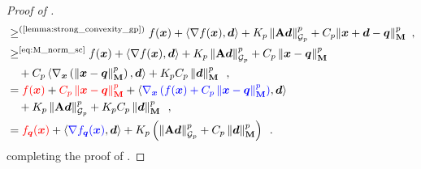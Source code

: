 \begin{proof}[Proof of ]
\begin{align*}
    &\geq^{\text{(\Cref{lemma:strong_convexity_gp})}} f(\vx) + \ip{\nabla f(\vx),\vd} + K_p\gnorm{\mA\vd}{p}^p+ C_p\|\vx+\vd - \vq\|_{\mM}^p\enspace,\\
    &\geq^{\text{\eqref{eq:M_norm_sc}}} f(\vx) + \ip{\nabla f(\vx),\vd} + K_p\gnorm{\mA\vd}{p}^p + C_p\norm{\vx-\vq}_{\mM}^p\\ 
    &\quad + C_p\ip{\nabla_{\vx} \inparen{\norm{\vx-\vq}_{\mM}^p}, \vd} + K_pC_p\norm{\vd}_{\mM}^p\enspace,\\
    &= \textcolor{red}{f(\vx)}  + \textcolor{red}{C_p\norm{\vx-\vq}_{\mM}^p} + \ip{\textcolor{blue}{\nabla_{\vx} \left(f(\vx) + C_p\norm{\vx-\vq}_{\mM}^p\right)},\vd}\\
    &\quad + K_p\gnorm{\mA\vd}{p}^p + K_pC_p\norm{\vd}_{\mM}^p\enspace,\\
    &= \textcolor{red}{f_{\vq}(\vx)} + \ip{\textcolor{blue}{\nabla f_{\vq}(\vx)},\vd} + K_p\inparen{\gnorm{\mA\vd}{p}^p + C_p\norm{\vd}_{\mM}^p}\enspace.
\end{align*}
completing the proof of .
\end{proof}


